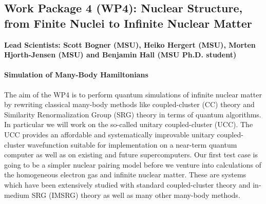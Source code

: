 \documentclass[10pt]{article}
\begin{document}
\subsection{Work Package 4 (WP4): Nuclear Structure, from Finite Nuclei to Infinite Nuclear Matter}
{\bf Lead Scientists: Scott Bogner (MSU), Heiko Hergert (MSU), Morten Hjorth-Jensen (MSU) and Benjamin Hall (MSU Ph.D. student)}
\paragraph{Simulation of Many-Body Hamiltonians}

The aim of the WP4 is to perform quantum simulations of infinite nuclear matter by rewriting classical many-body methods like coupled-cluster (CC) theory and Similarity Renormalization Group (SRG) theory in terms of quantum algorithms. In particular we will work on  the so-called unitary coupled-cluster (UCC). The UCC provides an affordable and systematically improvable unitary coupled-cluster wavefunction suitable for implementation on a near-term quantum computer as well as on existing and future supercomputers. Our first test case is going to be a simpler nuclear pairing model before we venture into calculations of the homogeneous electron gas and infinite nuclear matter. These are systems which have been extensively studied with standard coupled-cluster theory and in-medium SRG (IMSRG) theory as well as many other many-body methods.  
\end{document}
